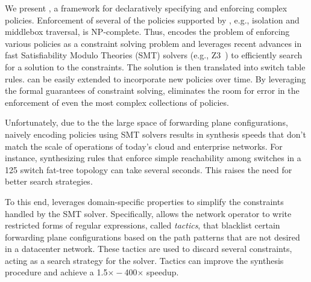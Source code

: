 We present \Name, a framework for declaratively specifying and
enforcing complex policies. Enforcement of several of
the policies supported by \Name, e.g., isolation and middlebox
traversal, is NP-complete. Thus, \Name 
encodes the problem of enforcing various
policies as a constraint solving problem and
leverages recent advances in
fast Satisfiability Modulo Theories (SMT) solvers (e.g., Z3~\cite{z3})
to efficiently search for a solution to the constraints. 
The solution is then translated into switch table rules. %
\Name can be easily extended to incorporate new policies over time. By
leveraging the formal guarantees of constraint solving, \Name
eliminates the room for error in the enforcement of even the most
complex collections of policies.

Unfortunately, 
due to the the large space of forwarding plane configurations,
naively encoding policies using SMT solvers results in
synthesis speeds that don't match the scale of operations of 
today's cloud and enterprise networks.
For instance, synthesizing 
rules that enforce simple
reachability among switches in a 125 switch fat-tree topology can take
several seconds. This raises the need for better search strategies.

To this
end, \Name leverages domain-specific properties to simplify the
constraints handled by the SMT solver.  Specifically, \Name allows the
network operator to write 
restricted forms of regular expressions, called \emph{tactics}, 
that blacklist certain
forwarding plane configurations based on the path patterns   
that are not desired in a datacenter network. 
These tactics are used to discard several constraints, 
acting as a search strategy for the solver.
Tactics can improve the synthesis procedure and achieve
a 1.5$\times - $400$\times$ speedup. 

